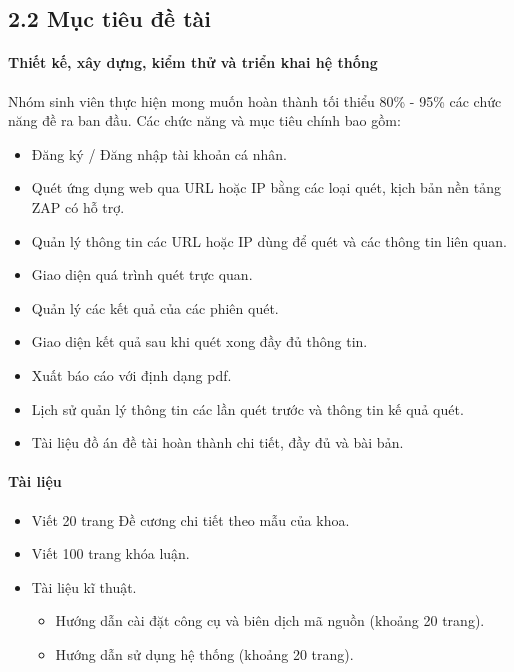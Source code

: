 \subsection*{2.2  Mục tiêu đề tài}
\paragraph{Thiết kế, xây dựng, kiểm thử và triển khai hệ thống}
\tab Nhóm sinh viên thực hiện mong muốn hoàn thành tối thiểu 80\% - 95\% các chức năng đề ra ban đầu. Các chức năng và mục tiêu chính bao gồm:
\begin{itemize}
    \item Đăng ký / Đăng nhập tài khoản cá nhân.
    \item Quét ứng dụng web qua URL hoặc IP bằng các loại quét, kịch bản nền tảng ZAP có hỗ trợ.
    \item Quản lý thông tin các URL hoặc IP dùng để quét và các thông tin liên quan.
    \item Giao diện quá trình quét trực quan.
    \item Quản lý các kết quả của các phiên quét.
    \item Giao diện kết quả sau khi quét xong đầy đủ thông tin.
    \item Xuất báo cáo với định dạng pdf.
    \item Lịch sử quản lý thông tin các lần quét trước và thông tin kế quả quét.
    \item Tài liệu đồ án đề tài hoàn thành chi tiết, đầy đủ và bài bản.
\end{itemize}
\paragraph{Tài liệu}
\begin{itemize}
    \item Viết 20 trang Đề cương chi tiết theo mẫu của khoa.
    \item Viết 100 trang khóa luận.
    \item Tài liệu kĩ thuật.
    \begin{itemize}
        \item Hướng dẫn cài đặt công cụ và biên dịch mã nguồn (khoảng 20 trang).
        \item Hướng dẫn sử dụng hệ thống (khoảng 20 trang).
    \end{itemize}
\end{itemize}